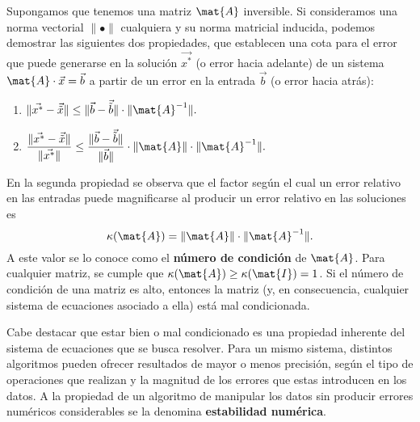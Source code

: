 Supongamos que tenemos una matriz $\mat{A}$ inversible. Si consideramos una norma
vectorial $\lVert \bullet \rVert$ cualquiera y su norma matricial inducida,
podemos demostrar las siguientes dos propiedades, que establecen una cota para
el error que puede generarse en la solución $\vec{x^\ast}$ (o error hacia
adelante) de un sistema $\mat{A} \cdot \vec{x} = \vec{b}$ a partir de un error
en la entrada $\vec{b}$ (o error hacia atrás):
\begin{enumerate}[label=(\roman*)]
\item $\lVert \vec{x^\ast} - \vec{\tilde x} \rVert \leq
    \lVert \vec{b} - \vec{\tilde b} \rVert \cdot
    \lVert \mat{A}^{-1} \rVert.$
\item $\dfrac{\lVert \vec{x^\ast} - \vec{\tilde x} \rVert}
        {\lVert \vec{x^\ast} \rVert} \leq
    \dfrac{\lVert \vec{b} - \vec{\tilde b} \rVert}
        {\lVert \vec{b} \rVert} \cdot
    \lVert \mat{A} \rVert \cdot
    \lVert \mat{A}^{-1} \rVert.$
\end{enumerate}

En la segunda propiedad se observa que el factor según el cual un error
relativo en las entradas puede magnificarse al producir un error relativo en
las soluciones es
\[ \kappa(\mat{A}) = \lVert \mat{A} \rVert \cdot \lVert \mat{A}^{-1} \rVert.
\]
A este valor se lo conoce como el \textbf{número de condición} de $\mat{A}$.
Para cualquier matriz, se cumple que $\kappa(\mat{A}) \geq \kappa(\mat{I})
= 1$. Si el número de condición de una matriz es alto, entonces la matriz
(y, en consecuencia, cualquier sistema de ecuaciones asociado a ella) está
mal condicionada.

Cabe destacar que estar bien o mal condicionado es una propiedad inherente del
sistema de ecuaciones que se busca resolver. Para un mismo sistema, distintos
algoritmos pueden ofrecer resultados de mayor o menos precisión, según el tipo
de operaciones que realizan y la magnitud de los errores que estas introducen
en los datos. A la propiedad de un algoritmo de manipular los datos sin
producir errores numéricos considerables se la denomina \textbf{estabilidad
numérica}.
